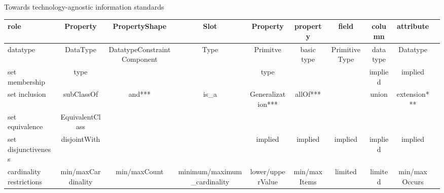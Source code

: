 \begin{frame}{Towards technology-agnostic information standards}
\begin{table}[overview of supported constructs for different meta-models]
{\begin{tabular}{lccccccccc}
        role                     & \tiny{Property}          & \tiny{PropertyShape}                & \tiny{Slot}                              & \tiny{Property}               & \tiny{property}                                                   & \tiny{field}                                                          & \tiny{column}                     & \tiny{attribute}                  \\ \hline
        datatype                 & \tiny{DataType}          & \tiny{DatatypeConstraintComponent}  & \tiny{Type}                              & \tiny{Primitve}               & \tiny{basic type}                                                 & \tiny{Primitive Type}                                                 & \tiny{data type}                  & \tiny{Datatype}    \\ \hline
        set membership           & \tiny{type}              &                                     &                                          & \tiny{type}                   &                                                                   &                                                                       & implied                           & implied                  \\ \hline
        set inclusion            & \tiny{subClassOf}        & \tiny{and***}                       & \tiny{is\_a}                             & \tiny{Generalization***}      & \tiny{allOf***}                                                   &                                                                       & \tiny{union}                      & \tiny{extension***}           \\ \hline
        set equivalence          & \tiny{EquivalentClass}   &                                     &                                          &                               &                                                                   &                                                                       &                                   &                    \\ \hline
        set disjunctiveness      & \tiny{disjointWith}      &                                     &                                          & implied                       & implied                                                           & implied                                                               & implied                           & implied            \\ \hline
        cardinality restrictions & \tiny{min/maxCardinality}& \tiny{min/maxCount}                 & \tiny{minimum/maximum\_cardinality}      & \tiny{lower/upperValue}       & \tiny{min/maxItems}                                               & limited                                                               & limited                           & \tiny{min/maxOccurs}                 

\end{tabular}}
\end{table}
\end{frame}
